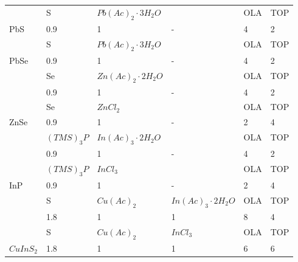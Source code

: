 \begin{longtable}{|p{2cm}|p{2.5cm}|p{3cm}|p{3cm}|p{1.5cm}|p{2cm}|}
    & \cellcolor[HTML]{C0C0C0}S & \cellcolor[HTML]{C0C0C0}$Pb(Ac)_2 \cdot 3H_2O$ & \cellcolor[HTML]{C0C0C0} & \cellcolor[HTML]{C0C0C0}OLA & \cellcolor[HTML]{C0C0C0}TOP \\ \cline{2-3} \cline{5-6} 
    \multirow{-2}{*}{PbS} & 0.9 & 1 & \multirow{-2}{*}{\cellcolor[HTML]{C0C0C0}-} & 4 & 2 \\ \hline

    & \cellcolor[HTML]{C0C0C0}S & \cellcolor[HTML]{C0C0C0}$Pb(Ac)_2 \cdot 3H_2O$ & \cellcolor[HTML]{C0C0C0} & \cellcolor[HTML]{C0C0C0}OLA & \cellcolor[HTML]{C0C0C0}TOP \\ \cline{2-3} \cline{5-6} 
    \multirow{-2}{*}{PbSe} & 0.9 & 1 & \multirow{-2}{*}{\cellcolor[HTML]{C0C0C0}-} & 4 & 2 \\ \hline

    & \cellcolor[HTML]{C0C0C0}Se & \cellcolor[HTML]{C0C0C0}$Zn(Ac)_2 \cdot 2H_2O$ & \cellcolor[HTML]{C0C0C0} & \cellcolor[HTML]{C0C0C0}OLA & \cellcolor[HTML]{C0C0C0}TOP \\ \cline{2-3} \cline{5-6} 
     & 0.9 & 1 & \multirow{-2}{*}{\cellcolor[HTML]{C0C0C0}-} & 4 & 2 \\ 
     \cline{2-6} 
     & \cellcolor[HTML]{C0C0C0}Se & \cellcolor[HTML]{C0C0C0}$ZnCl_2$ & \cellcolor[HTML]{C0C0C0} & \cellcolor[HTML]{C0C0C0}OLA & \cellcolor[HTML]{C0C0C0}TOP \\ 
     \cline{2-3} \cline{5-6} 
    \multirow{-4}{*}{ZnSe} & 0.9 & 1 & \multirow{-2}{*}{\cellcolor[HTML]{C0C0C0}-} & 2 & 4 \\ 
    \hline

    & \cellcolor[HTML]{C0C0C0}$(TMS)_3P$ & \cellcolor[HTML]{C0C0C0}$In(Ac)_3 \cdot 2H_2O$ & \cellcolor[HTML]{C0C0C0} & \cellcolor[HTML]{C0C0C0}OLA & \cellcolor[HTML]{C0C0C0}TOP \\ \cline{2-3} \cline{5-6} 
     & 0.9 & 1 & \multirow{-2}{*}{\cellcolor[HTML]{C0C0C0}-} & 4 & 2 \\ 
     \cline{2-6} 
     & \cellcolor[HTML]{C0C0C0}$(TMS)_3P$ & \cellcolor[HTML]{C0C0C0}$InCl_3$ & \cellcolor[HTML]{C0C0C0} & \cellcolor[HTML]{C0C0C0}OLA & \cellcolor[HTML]{C0C0C0}TOP \\ 
     \cline{2-3} \cline{5-6} 
    \multirow{-4}{*}{InP} & 0.9 & 1 & \multirow{-2}{*}{\cellcolor[HTML]{C0C0C0}-} & 2 & 4 \\ 
    \hline

    & \cellcolor[HTML]{C0C0C0}S & \cellcolor[HTML]{C0C0C0}$Cu(Ac)_2$ & \cellcolor[HTML]{C0C0C0}$In(Ac)_3 \cdot 2H_2O$ & \cellcolor[HTML]{C0C0C0}OLA & \cellcolor[HTML]{C0C0C0}TOP \\ \cline{2-6} 
    & 1.8 & 1 & 1 & 8 & 4 \\ \cline{2-6} 
    & \cellcolor[HTML]{C0C0C0}S & \cellcolor[HTML]{C0C0C0}$Cu(Ac)_2$ & \cellcolor[HTML]{C0C0C0}$InCl_3$ & \cellcolor[HTML]{C0C0C0}OLA & \cellcolor[HTML]{C0C0C0}TOP \\ \cline{2-6} \multirow{-4}{*}{$CuInS_2$} & 1.8 & 1 & 1 & 6 & 6 \\ \hline


\end{longtable}
